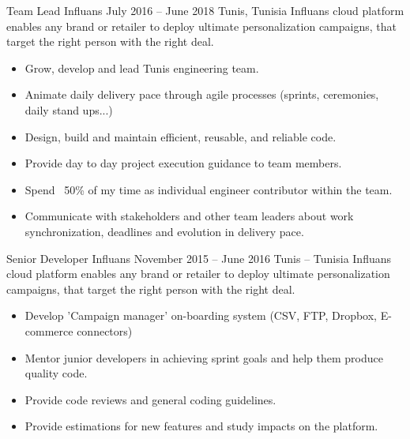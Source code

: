 \documentclass[10pt,a4paper]{resume-settings}
\begin{document}
\cvevent
    {Team Lead}
    {Influans}
    {July 2016 -- June 2018}
    {Tunis, Tunisia}
    {Influans cloud platform enables any brand or retailer to deploy ultimate personalization campaigns, that target the right person with the right deal.}
    \begin{itemize}
        \item Grow, develop and lead Tunis engineering team.
        \item Animate daily delivery pace through agile processes (sprints, ceremonies, daily stand ups...)
        \item Design, build and maintain efficient, reusable, and reliable code.
        \item Provide day to day project execution guidance to team members.
        \item Spend ~50\% of my time as individual engineer contributor within the team.
        \item Communicate with stakeholders and other team leaders about work synchronization, deadlines and evolution in delivery pace.
    \end{itemize}

\divider

\cvevent
    {Senior Developer}
    {Influans}
    {November 2015 --  June 2016}
    {Tunis -- Tunisia}
    {Influans cloud platform enables any brand or retailer to deploy ultimate personalization campaigns, that target the right person with the right deal.}
    \begin{itemize}
        \item Develop 'Campaign manager' on-boarding system (CSV, FTP, Dropbox, E-commerce connectors)
        \item Mentor junior developers in achieving sprint goals and help them produce quality code.
        \item Provide code reviews and general coding guidelines.
        \item Provide estimations for new features and study impacts on the platform.
    \end{itemize}
\divider

\clearpage

\end{document}
